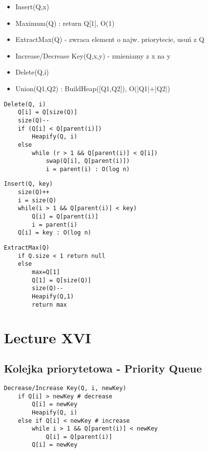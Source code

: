 \documentclass{article}
\numberwithin{equation}{subsection}
\begin{document}
\begin{itemize}
    \item Insert(Q,x)
    \item Maximum(Q) : return Q[1], O(1)
    \item ExtractMax(Q) - zwraca element o najw. priorytecie, usuń z Q
    \item Increase/Decrease Key(Q,x,y) - zmieniamy z x na y
    \item Delete(Q,i)
    \item Union(Q1,Q2) : BuildHeap([Q1,Q2]), O(|Q1|+|Q2|)
\end{itemize}

\begin{verbatim}
Delete(Q, i)
    Q[i] = Q[size(Q)]
    size(Q)--
    if (Q[i] < Q[parent(i)])
        Heapify(Q, i)
    else
        while (r > 1 && Q[parent(i)] < Q[i])
            swap(Q[i], Q[parent(i)])
            i = parent(i) : O(log n)
\end{verbatim}

\begin{verbatim}
Insert(Q, key)
    size(Q)++
    i = size(Q)
    while(i > 1 && Q[parent(i)] < key)
        Q[i] = Q[parent(i)]
        i = parent(i)
    Q[i] = key : O(log n)
\end{verbatim}

\begin{verbatim}
ExtractMax(Q)
    if Q.size < 1 return null
    else
        max=Q[1]
        Q[1] = Q[size(Q)]
        size(Q)--
        Heapify(Q,1)
        return max
\end{verbatim}

\section{Lecture XVI}

\subsection{Kolejka priorytetowa - Priority Queue}

\newpage

\begin{verbatim}
Decrease/Increase Key(Q, i, newKey)
    if Q[i] > newKey # decrease
        Q[i] = newKey
        Heapify(Q, i)
    else if Q[i] < newKey # increase
        while i > 1 && Q[parent(i)] < newKey
            Q[i] = Q[parent(i)]
        Q[i] = newKey
\end{verbatim}
\end{document}
